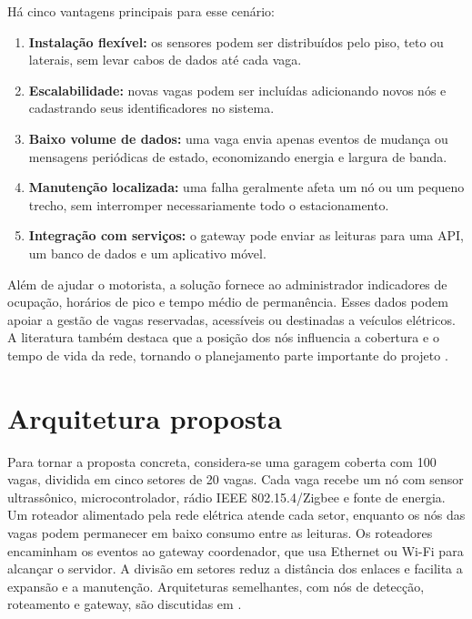 \documentclass[11pt,a4paper]{article}
\begin{document}
Há cinco vantagens principais para esse cenário:
\begin{enumerate}[label=\arabic*.,leftmargin=1cm]
    \item \textbf{Instalação flexível:} os sensores podem ser distribuídos pelo piso, teto ou laterais, sem levar cabos de dados até cada vaga.
    \item \textbf{Escalabilidade:} novas vagas podem ser incluídas adicionando novos nós e cadastrando seus identificadores no sistema.
    \item \textbf{Baixo volume de dados:} uma vaga envia apenas eventos de mudança ou mensagens periódicas de estado, economizando energia e largura de banda.
    \item \textbf{Manutenção localizada:} uma falha geralmente afeta um nó ou um pequeno trecho, sem interromper necessariamente todo o estacionamento.
    \item \textbf{Integração com serviços:} o gateway pode enviar as leituras para uma API, um banco de dados e um aplicativo móvel.
\end{enumerate}

Além de ajudar o motorista, a solução fornece ao administrador indicadores de ocupação, horários de pico e tempo médio de permanência. Esses dados podem apoiar a gestão de vagas reservadas, acessíveis ou destinadas a veículos elétricos. A literatura também destaca que a posição dos nós influencia a cobertura e o tempo de vida da rede, tornando o planejamento parte importante do projeto \cite{bagula2015}.

\section{Arquitetura proposta}
Para tornar a proposta concreta, considera-se uma garagem coberta com 100 vagas, dividida em cinco setores de 20 vagas. Cada vaga recebe um nó com sensor ultrassônico, microcontrolador, rádio IEEE 802.15.4/Zigbee e fonte de energia. Um roteador alimentado pela rede elétrica atende cada setor, enquanto os nós das vagas podem permanecer em baixo consumo entre as leituras. Os roteadores encaminham os eventos ao gateway coordenador, que usa Ethernet ou Wi-Fi para alcançar o servidor. A divisão em setores reduz a distância dos enlaces e facilita a expansão e a manutenção. Arquiteturas semelhantes, com nós de detecção, roteamento e gateway, são discutidas em \cite{bagula2015,hilmani2018}.
\end{document}
